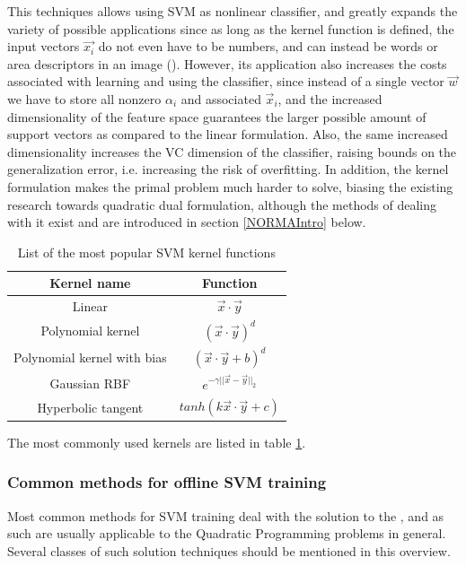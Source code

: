 This techniques allows using SVM as nonlinear classifier, and greatly expands the  variety of possible applications since as long as the kernel function is defined, the input vectors $\vec{x_i}$ do not even have to be numbers, and can instead be words or area descriptors in an image (\cite{bertelli2011kernelized}). However, its application also increases the costs associated with learning and using the classifier, since instead of a single vector $\vec{w}$ we have to store all nonzero $\alpha_i$ and associated $\vec{x}_i$, and the increased dimensionality of the feature space guarantees the larger possible amount of support vectors as compared to the linear formulation. Also, the same increased dimensionality increases the VC dimension of the classifier, raising bounds on the generalization error, i.e. increasing the risk of overfitting. In addition, the kernel formulation makes the primal problem much harder to solve, biasing the existing research towards quadratic dual formulation, although the methods of dealing with it exist and are introduced in  section \ref{NORMAIntro} below.
\begin{table}
\centering
    \begin{tabular}{|c|c|}
        \hline
        Kernel name                 & Function \\ \hline
        Linear                      & $\vec{x}\cdot \vec{y}$       \\ \hline
        Polynomial kernel           & $(\vec{x}\cdot \vec{y})^d$        \\ \hline
        Polynomial kernel with bias & $(\vec{x}\cdot \vec{y}+b)^d$        \\ \hline
        Gaussian RBF                & $e^{-\gamma||\vec{x}-\vec{y}||_2}$         \\  \hline
        Hyperbolic tangent          & $tanh(k\vec{x}\cdot \vec{y}+c)$        \\
        \hline
    \end{tabular}
\caption[List of SVM kernel functions]{List of the most popular SVM kernel functions}
\label{Kernels}
\end{table}
The most commonly used kernels are listed in table \ref{Kernels}.



\subsubsection{Common methods for offline SVM training}
Most common methods for SVM training deal with the solution to the , and as such are usually applicable to the Quadratic Programming problems in general. Several classes of such solution techniques should be mentioned in this overview. 

